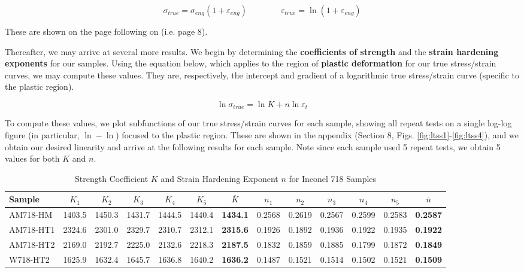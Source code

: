 \documentclass{article}
\begin{document}
$$\sigma_{true} = \sigma_{eng}(1+\varepsilon_{eng})\quad \quad \quad \quad \varepsilon_{true} = \ln(1+\varepsilon_{eng}) $$

These are shown on the page following on (i.e. page 8).

Thereafter, we may arrive at several more results. We begin by determining the \textbf{coefficients of strength} and the \textbf{strain hardening exponents} for our samples. Using the equation below, which applies to the region of \textbf{plastic deformation} for our true stress/strain curves, we may compute these values. They are, respectively, the intercept and gradient of a logarithmic true stress/strain curve (specific to the plastic region).

$$\ln \sigma_{true} = \ln K + n \ln {\varepsilon_t} $$

To compute these values, we plot subfunctions of our true stress/strain curves for each sample, showing all repeat tests on a single log-log figure (in particular, $\ln-\ln$) focused to the plastic region. These are shown in the appendix (Section 8, Figs. \ref{fig:ltss1}-\ref{fig:ltss4}), and we obtain our desired linearity and arrive at the following results for each sample. Note since each sample used 5 repeat tests, we obtain 5 values for both $K$ and $n$.
\vspace{-1em}

\begin{table}[H]
	\centering
	\footnotesize
	\caption{Strength Coefficient $K$ and Strain Hardening Exponent $n$ for Inconel 718 Samples}
	\vspace{0.5em}
	\label{tab:hollomon}
	\begin{tabular}{lcccccccccccc}
		\hline
		\textbf{Sample} & $K_1$ & $K_2$ & $K_3$ & $K_4$ & $K_5$ & $\overline{K}$ & $n_1$ & $n_2$ & $n_3$ & $n_4$ & $n_5$ & $\overline{n}$ \\
		\hline
		AM718-HM  & 1403.5 & 1450.3 & 1431.7 & 1444.5 & 1440.4 & \textbf{1434.1} & 0.2568 & 0.2619 & 0.2567 & 0.2599 & 0.2583 & \textbf{0.2587} \\
		AM718-HT1 & 2324.6 & 2301.0 & 2329.7 & 2310.7 & 2312.1 & \textbf{2315.6} & 0.1926 & 0.1892 & 0.1936 & 0.1922 & 0.1935 & \textbf{0.1922} \\
		AM718-HT2 & 2169.0 & 2192.7 & 2225.0 & 2132.6 & 2218.3 & \textbf{2187.5} & 0.1832 & 0.1859 & 0.1885 & 0.1799 & 0.1872 & \textbf{0.1849} \\
		W718-HT2  & 1625.9 & 1632.4 & 1645.7 & 1636.8 & 1640.2 & \textbf{1636.2} & 0.1487 & 0.1521 & 0.1514 & 0.1502 & 0.1521 & \textbf{0.1509} \\
		\hline
	\end{tabular}
\end{table}
\end{document}
